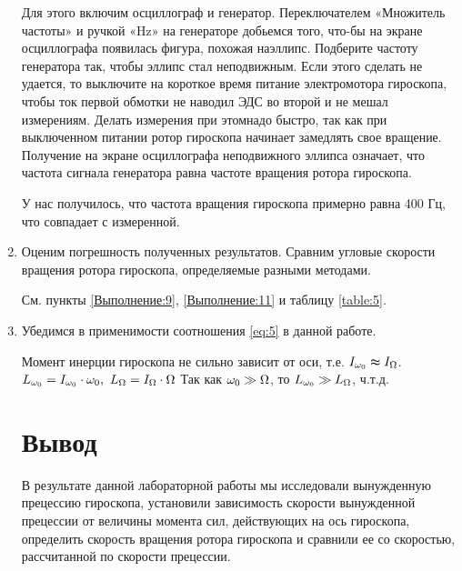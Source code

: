 \documentclass[a4paper,12pt]{article} %
\begin{document}
\begin{enumerate}
  Для этого включим осциллограф и генератор. Переключателем «Множитель частоты» и ручкой «Hz» на генераторе добьемся того, что-бы на экране осциллографа появилась фигура, похожая наэллипс. Подберите частоту генератора так, чтобы эллипс стал неподвижным. Если этого сделать не удается, то выключите на короткое время питание электромотора гироскопа, чтобы ток первой обмотки не наводил ЭДС во второй и не мешал измерениям. Делать измерения при этомнадо быстро, так как при выключенном питании ротор гироскопа начинает замедлять свое вращение. Получение на экране осциллографа неподвижного эллипса означает, что частота сигнала генератора равна частоте вращения ротора гироскопа.

  У нас получилось, что частота вращения гироскопа примерно равна 400 Гц, что совпадает с измеренной.

  \item \label{Выполнение:12}  Оценим погрешность полученных результатов. Сравним угловые скорости вращения ротора гироскопа, определяемые разными методами.

См. пункты \ref{Выполнение:9}, \ref{Выполнение:11} и таблицу \ref{table:5}.

  \item  Убедимся в применимости соотношения \eqref{eq:5} в данной работе.
  
Момент инерции гироскопа не сильно зависит от оси, т.е. $I_{\omega_0} \thickapprox I_\Omega$.
$L_{\omega_0} = I_{\omega_0} \cdot \omega_0,\ L_\Omega = I_\Omega \cdot \Omega$
Так как $\omega_0 \gg \Omega$, то $L_{\omega_0} \gg L_\Omega$, ч.т.д.

\section{Вывод}
В результате данной лабораторной работы мы исследовали вынужденную прецессию гироскопа, установили зависимость скорости вынужденной прецессии от величины момента сил, действующих на ось гироскопа, определить скорость вращения ротора гироскопа и сравнили ее со скоростью, рассчитанной по скорости прецессии.

\end{enumerate}
\end{document}
